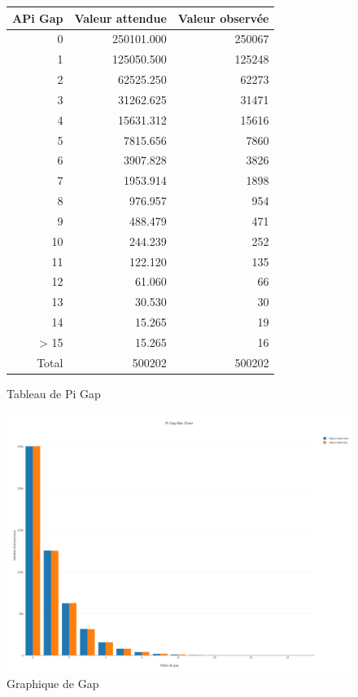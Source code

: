 \documentclass[10pt,a4paper]{article}
\begin{document}
\begin{figure}[h]
	\centering
	\begin{tabular}{|r|r|r|}
		\hline
		APi Gap & Valeur attendue & Valeur observée\\
		\hline
		0 & 250101.000 & 250067\\
		1 & 125050.500 & 125248\\
		2 & 62525.250 & 62273\\
		3 & 31262.625 & 31471\\
		4 & 15631.312 & 15616\\
		5 & 7815.656 & 7860\\
		6 & 3907.828 & 3826\\
		7 & 1953.914 & 1898\\
		8 & 976.957 & 954\\
		9 & 488.479 & 471\\
		10 & 244.239 & 252\\
		11 & 122.120 & 135\\
		12 & 61.060 & 66\\
		13 & 30.530 & 30\\
		14 & 15.265 & 19\\
		> 15 & 15.265 & 16\\
		\hline
		Total & 500202 & 500202\\
		\hline
	\end{tabular}
	\caption{Tableau de Pi Gap}
\end{figure}

\begin{figure}[h]
\centering
\includegraphics[scale=0.25]{../chart_images/pi_gap_bar_chart.png}
\caption{Graphique de Gap}
\end{figure}
\newpage
\end{document}
